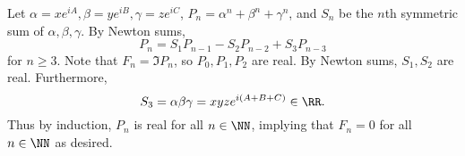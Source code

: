 Let $\alpha=xe^{iA},\beta=ye^{iB},\gamma=ze^{iC}$, $P_n=\alpha^n+\beta^n+\gamma^n$, and $S_n$ be the $n$th symmetric sum of $\alpha,\beta,\gamma$. By Newton sums,
\[
	P_n=S_1P_{n-1}-S_2P_{n-2}+S_3P_{n-3}
\]
for $n\geq3$. Note that $F_n=\Im P_n$, so $P_0,P_1,P_2$ are real. By Newton sums, $S_1,S_2$ are real. Furthermore,
\[
	S_3=\alpha\beta\gamma=xyze^{i(A+B+C)}\in\RR.
\]
Thus by induction, $P_n$ is real for all $n\in\NN$, implying that $F_n=0$ for all $n\in\NN$ as desired.
